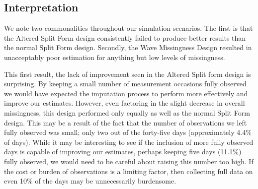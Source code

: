 \documentclass{svjour3}\usepackage[]{graphicx}\usepackage[]{color}
\begin{document}

\subsection{Interpretation}
\label{sec:3.5}
We note two commonalities throughout our simulation scenarios. The first is that the Altered Split Form design consistently failed to produce better results than the normal Split Form design. Secondly, the Wave Missingness Design resulted in unacceptably poor estimation for anything but low levels of missingness. \par

This first result, the lack of improvement seen in the Altered Split form design is surprising. By keeping a small number of measurement occasions fully observed we would have expected the imputation process to perform more effectively and improve our estimates. However, even factoring in the slight decrease in overall missingness, this design performed only equally as well as the normal Split Form design. This may be a result of the fact that the number of observations we left fully observed was small; only two out of the forty-five days (approximately 4.4\% of days). While it may be interesting to see if the inclusion of more fully observed days is capable of improving our estimates, perhaps keeping five days (11.1\%) fully observed, we would need to be careful about raising this number too high. If the cost or burden of observations is a limiting factor, then collecting full data on even 10\% of the days may be unnecessarily burdensome. \par
\end{document}
